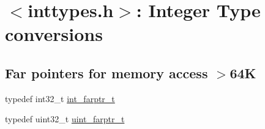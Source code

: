 \hypertarget{group__avr__inttypes}{}\section{$<$inttypes.\+h$>$\+: Integer Type conversions}
\label{group__avr__inttypes}
\subsection*{Far pointers for memory access $>$64K}
\begin{DoxyCompactItemize}
\item 
typedef int32\+\_\+t \hyperlink{group__avr__inttypes_ga5082b177b7d7b2039652c26a72b96d18}{int\+\_\+farptr\+\_\+t}
\item 
typedef uint32\+\_\+t \hyperlink{group__avr__inttypes_ga72b6692e3f3123903c1a0d9a960c59b1}{uint\+\_\+farptr\+\_\+t}
\end{DoxyCompactItemize}
